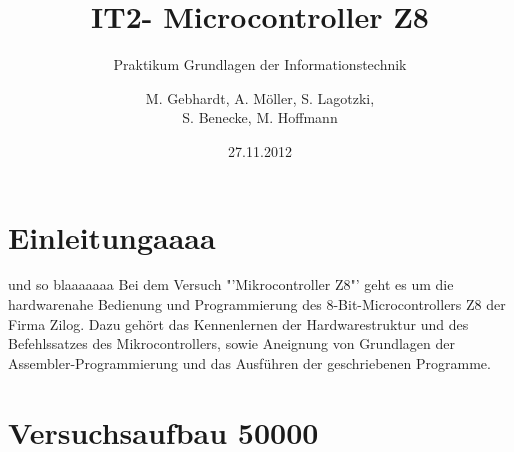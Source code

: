 
\usepackage{paralist} %
\usepackage{circuitikz} %
\usepackage{picins}
\usepackage{wasysym}
\usepackage{pict2e}
\usepackage{lscape}
\usepackage{soul}
\usepackage[right]{eurosym}
\usepackage{array}
\usepackage{multirow}
\usepackage{tikz}
\usetikzlibrary{shapes,arrows}
\title{IT2- Microcontroller Z8}
\subtitle{Praktikum Grundlagen der Informationstechnik}
\author{M. Gebhardt, A. Möller, S. Lagotzki,\\S. Benecke, M. Hoffmann}
\date{27.11.2012}
\publishers{Marc.Gebhardt@st.ovgu.de}

\maketitle
{}
\begingroup
  \pagestyle{empty}
  \tableofcontents
  \newpage
\endgroup  
\setcounter{page}{1}


\section{Einleitungaaaa}

und so blaaaaaaa
Bei dem Versuch "'Mikrocontroller Z8"' geht es um die hardwarenahe Bedienung und Programmierung des 8-Bit-Microcontrollers Z8 der Firma Zilog. Dazu gehört das Kennenlernen der Hardwarestruktur und des Befehlssatzes des Mikrocontrollers, sowie Aneignung von Grundlagen der Assembler-Programmierung und das Ausführen der geschriebenen Programme. 

\section{Versuchsaufbau 50000}

